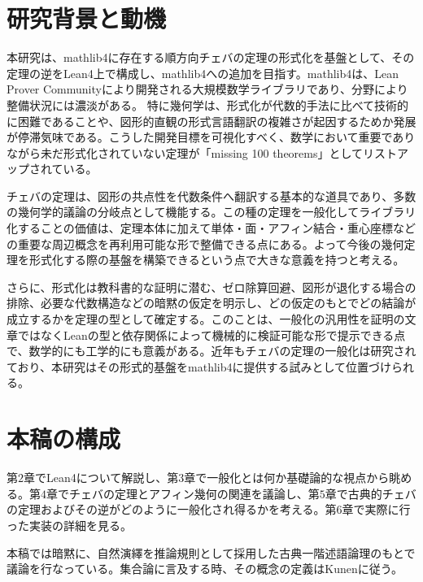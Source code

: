 \documentclass[a4paper,12pt]{bxjsbook}
\newlength{\customindent}
\newenvironment{body}{
  \par
  \begingroup
  \setlength{\leftskip}{\customindent}
  \setlength{\rightskip}{0pt}
  \setlength{\parindent}{1em}
  \setlength{\displayindent}{\customindent}
  \setlength{\displaywidth}{\dimexpr\linewidth-\customindent\relax}
}{
  \par
  \endgroup
}
\theoremstyle{theorem}
\begin{document}
    \section{研究背景と動機}
    \begin{body}
        \indent 本研究は、mathlib4に存在する順方向チェバの定理の形式化を基盤として、その定理の逆をLean4上で構成し、mathlib4への追加を目指す。mathlib4は、Lean Prover Communityにより開発される大規模数学ライブラリ\cite{LeanProverCommunity}であり、分野により整備状況には濃淡がある。
        特に幾何学は、形式化が代数的手法に比べて技術的に困難であることや、図形的直観の形式言語翻訳の複雑さが起因するためか発展が停滞気味である。こうした開発目標を可視化すべく、数学において重要でありながら未だ形式化されていない定理が「missing 100 theorems」としてリストアップされている。

        \indent チェバの定理は、図形の共点性を代数条件へ翻訳する基本的な道具であり、多数の幾何学的議論の分岐点として機能する。この種の定理を一般化してライブラリ化することの価値は、定理本体に加えて単体・面・アフィン結合・重心座標などの重要な周辺概念を再利用可能な形で整備できる点にある。よって今後の幾何定理を形式化する際の基盤を構築できるという点で大きな意義を持つと考える。

        \indent さらに、形式化は教科書的な証明に潜む、ゼロ除算回避、図形が退化する場合の排除、必要な代数構造などの暗黙の仮定を明示し、どの仮定のもとでどの結論が成立するかを定理の型として確定する。このことは、一般化の汎用性を証明の文章ではなくLeanの型と依存関係によって機械的に検証可能な形で提示できる点で、数学的にも工学的にも意義がある。近年もチェバの定理の一般化は研究されており、本研究はその形式的基盤をmathlib4に提供する試みとして位置づけられる。
    \end{body}

    \section{本稿の構成}
    \begin{body}
        \indent 第$2$章でLean4について解説し、第$3$章で一般化とは何か基礎論的な視点から眺める。第$4$章でチェバの定理とアフィン幾何の関連を議論し、第$5$章で古典的チェバの定理およびその逆がどのように一般化され得るかを考える。第$6$章で実際に行った実装の詳細を見る。

        \indent 本稿では暗黙に、自然演繹を推論規則として採用した古典一階述語論理のもとで議論を行なっている。集合論に言及する時、その概念の定義はKunenに従う。\cite{Kunen}

    \end{body}
\end{document}
